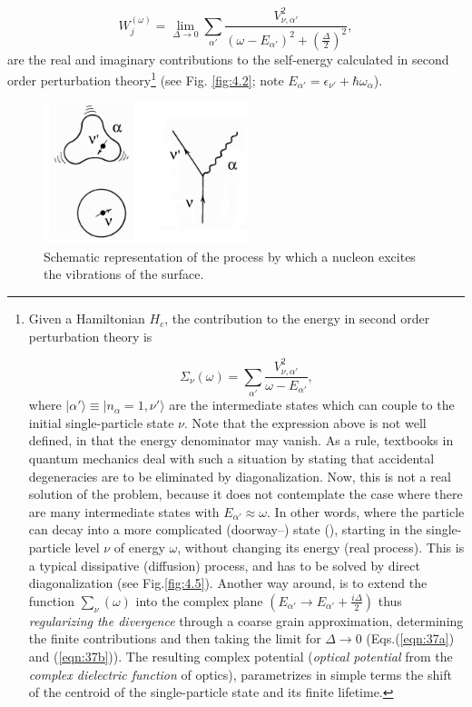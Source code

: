 \begin{equation}
W_j^{(\omega)}  = \lim_{\Delta \rightarrow 0} \sum_{\alpha'} \frac{V_{\nu ,\alpha'}^2}{(\omega -E_{\alpha'})^2 + (\frac{\Delta}{2})^2},
\label{eqn:37b}
\end{equation}
are the real and imaginary contributions to the self-energy calculated in second order perturbation theory\footnote{Given a Hamiltonian $H_{c}$, the contribution to the energy in second order perturbation theory is

{\protect
\begin{equation}
\nonumber\Sigma_{\nu}(\omega) = \sum_{\alpha'} \frac{V_{\nu ,\alpha'}^2}{\omega - E_{\alpha'}} ,
\label{eqn:37c}
\end{equation}
}
where $|\alpha' \rangle \equiv |n_{\alpha}=1,\nu' \rangle$ are the intermediate states which can couple to the initial single-particle state $\nu$. Note that the expression above is not well defined, in that the energy denominator may vanish. As a rule, textbooks in quantum mechanics deal with such a situation by stating that accidental degeneracies are to be eliminated by diagonalization. Now, this is not a real solution of the problem, because it does not contemplate the case where there are many intermediate states with $E_{\alpha'} \approx \omega$. In other words, where the particle can decay into a more complicated (doorway--) state (\cite{Feshbach:58}), starting in the single-particle level $\nu$ of energy $\omega$, without changing its energy (real process). This is a typical dissipative (diffusion) process, and has to be solved by direct diagonalization (see Fig.\ref{fig:4.5}). Another way around, is to extend the function $\sum_{\nu}(\omega)$ into the complex plane $(E_{\alpha'} \rightarrow E_{\alpha'} + \frac{i\Delta}{2})$ thus {\it regularizing the divergence} through a coarse grain approximation, determining the finite contributions and then taking the limit for $\Delta \rightarrow 0$ (Eqs.(\ref{eqn:37a}) and (\ref{eqn:37b})). The resulting complex potential ({\it optical potential} from the {\it complex dielectric function} of optics), parametrizes in simple terms the shift of the centroid of the single-particle state and its finite lifetime.} (see Fig. \ref{fig:4.2}; note $E_{\alpha'}=\epsilon_{\nu'}+\hbar\omega_\alpha$).

\begin{figure}[h!]
\centerline {
\includegraphics*[width=6cm]{introduccion/figs/figintroD1}
}
\caption{Schematic representation of the process by which a nucleon excites the vibrations of the surface.}
\label{fig:4.1}
\end{figure}

